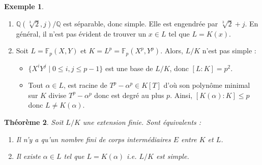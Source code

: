 \documentclass{article}
\newcommand{\Q}{\mathbb{Q}}
\newcommand{\F}{\mathbb{F}}
\theoremstyle{plain}
\newtheorem{theorem}{Théorème}[subsection]
\theoremstyle{definition}
\newtheorem{example}[theorem]{Exemple}
\theoremstyle{remark}
\begin{document}
\begin{example} \leavevmode
    \begin{enumerate}
        \item $\Q(\sqrt[3]{2},j)/\Q$ est séparable, donc simple. Elle est engendrée par $\sqrt[3]{2} + j$. En général, il n'est pas évident de trouver un $x \in L$ tel que $L = K(x)$.
        \item Soit $L = \F_p (X,Y)$ et $K = L^p = \F_p(X^p,Y^p)$. Alors, $L/K$ n'est pas simple :
        \begin{itemize}
            \item $\{X^i Y^j \mid 0\le i,j\le p-1\}$ est une base de $L/K$, donc $[L : K] = p^2$.
            \item Tout $\alpha \in L$, est racine de $T^p - \alpha^p \in K[T]$ d'où son polynôme minimal sur $K$ divise $T^p - \alpha^p$ donc est degré au plus $p$. Ainsi, $[K(\alpha) : K] \le p$ donc $L \ne K(\alpha)$.
        \end{itemize}
    \end{enumerate}
\end{example}

\begin{theorem}
    Soit $L/K$ une extension finie. Sont équivalents :
    \begin{enumerate}
        \item Il n'y a qu'un nombre fini de corps intermédiaires $E$ entre $K$ et $L$.
        \item Il existe $\alpha \in L$ tel que $L = K(\alpha)$ i.e. $L/K$ est simple.
    \end{enumerate}
\end{theorem}
\end{document}
